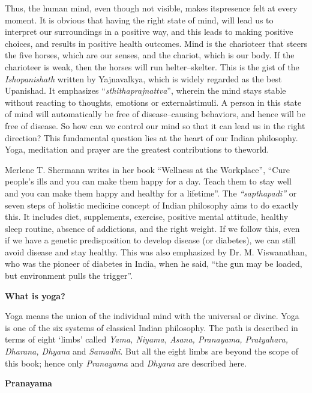Thus, the human mind, even though not visible, makes its\break presence felt at every moment. It is obvious that having the right state of mind, will lead us to interpret our surroundings in a positive way, and this leads to making positive choices, and results in positive health outcomes. Mind is the charioteer that steers the five horses, which are our senses, and the chariot, which is our body. If the chario\-teer is weak, then the horses will run helter–skelter. This is the gist of the \textit{Ishopanishath} written by Yajnavalkya, which is widely regarded as the best Upanishad. It emphasizes “\textit{sthithaprajnattva}”, wherein the mind stays stable without reacting to thoughts, emotions or external\break stimuli. A person in this state of mind will automatically be free of disease–causing behaviors, and hence will be free of disease. So how can we control our mind so that it can lead us in the right direction? This fundamental question lies at the heart of our Indian philosophy. Yoga, meditation and prayer are the greatest contributions to the\break world.

Merlene T. Shermann writes in her book “Wellness at the Workplace”, “Cure people’s ills and you can make them happy for a day. Teach them to stay well and you can make them happy and healthy for a lifetime”. The \textit{“sapthapadi”} or seven steps of holistic medicine concept of Indian philosophy aims to do exactly this. It includes diet, supplements, exercise, positive mental attitude, healthy sleep routine, absence of addictions, and the right weight. If we follow this, even if we have a genetic predisposition to develop disease (or diabetes), we can still avoid disease and stay healthy. This was also emphasized by Dr. M. Viswanathan, who was the pioneer of diabetes in India, when he said, “the gun may be loaded, but environment pulls the trigger”.


\noindent\textbf{What is yoga?}

Yoga means the union of the individual mind with the universal or divine. Yoga is one of the six systems of classical Indian philo\-sophy. The path is described in terms of eight ‘limbs’ called \textit{Yama, Niyama, Asana, Pranayama, Pratyahara, Dharana, Dhyana} and \textit{Samadhi}. But all the eight limbs are beyond the scope of this book; hence only \textit{Pranayama} and \textit{Dhyana} are described here.

\noindent\textbf{Pranayama}

